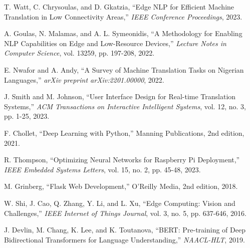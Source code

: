 \documentclass[conference]{IEEEtran}
\begin{document}
\begin{thebibliography}{9}

T. Watt, C. Chrysoulas, and D. Gkatzia, ``Edge NLP for Efficient Machine Translation in Low Connectivity Areas,'' \textit{IEEE Conference Proceedings}, 2023.

A. Goulas, N. Malamas, and A. L. Symeonidis, ``A Methodology for Enabling NLP Capabilities on Edge and Low-Resource Devices,'' \textit{Lecture Notes in Computer Science}, vol. 13259, pp. 197-208, 2022.

E. Nwafor and A. Andy, ``A Survey of Machine Translation Tasks on Nigerian Languages,'' \textit{arXiv preprint arXiv:2201.00000}, 2022.

J. Smith and M. Johnson, ``User Interface Design for Real-time Translation Systems,'' \textit{ACM Transactions on Interactive Intelligent Systems}, vol. 12, no. 3, pp. 1-25, 2023.

F. Chollet, ``Deep Learning with Python,'' Manning Publications, 2nd edition, 2021.

R. Thompson, ``Optimizing Neural Networks for Raspberry Pi Deployment,'' \textit{IEEE Embedded Systems Letters}, vol. 15, no. 2, pp. 45-48, 2023.

M. Grinberg, ``Flask Web Development,'' O'Reilly Media, 2nd edition, 2018.

W. Shi, J. Cao, Q. Zhang, Y. Li, and L. Xu, ``Edge Computing: Vision and Challenges,'' \textit{IEEE Internet of Things Journal}, vol. 3, no. 5, pp. 637-646, 2016.

J. Devlin, M. Chang, K. Lee, and K. Toutanova, ``BERT: Pre-training of Deep Bidirectional Transformers for Language Understanding,'' \textit{NAACL-HLT}, 2019.

\end{thebibliography}
\end{document}
